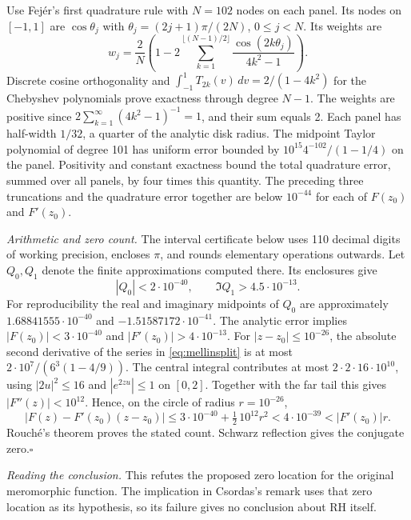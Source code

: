 \documentclass[11pt,a4paper]{article}
\begin{document}
Use Fej\'er's first quadrature rule with $N=102$ nodes on each panel.
Its nodes on $[-1,1]$ are $\cos\theta_j$ with
$\theta_j=(2j+1)\pi/(2N)$, $0\le j<N$. Its weights are
\[
 w_j=\frac2N\left(1-2\sum_{k=1}^{\lfloor(N-1)/2\rfloor}
                   \frac{\cos(2k\theta_j)}{4k^2-1}\right).
\]
Discrete cosine orthogonality and
$\int_{-1}^{1}T_{2k}(v)\,dv=2/(1-4k^2)$ for the Chebyshev
polynomials prove exactness through degree $N-1$. The weights are
positive since $2\sum_{k=1}^{\infty}(4k^2-1)^{-1}=1$, and their
sum equals 2. Each panel has half-width $1/32$, a quarter of the
analytic disk radius. The midpoint Taylor polynomial of degree 101
has uniform error bounded by $10^{15}4^{-102}/(1-1/4)$ on the panel.
Positivity and constant exactness bound the total quadrature error,
summed over all panels, by four times this quantity. The preceding
three truncations and the quadrature error together are below $10^{-44}$
for each of $F(z_0)$ and $F'(z_0)$.

\medskip\noindent
\emph{Arithmetic and zero count.} The interval certificate below uses
110 decimal digits of working precision, encloses $\pi$, and rounds
elementary operations outwards. Let $Q_0,Q_1$ denote the finite
approximations computed there. Its enclosures give
\[
 |Q_0|<2\cdot10^{-40},\qquad \Im Q_1>4.5\cdot10^{-13}.
\]
For reproducibility the real and imaginary midpoints of $Q_0$ are
approximately $1.68841555\cdot10^{-40}$ and
$-1.51587172\cdot10^{-41}$. The analytic error implies
$|F(z_0)|<3\cdot10^{-40}$ and $|F'(z_0)|>4\cdot10^{-13}$.
For $|z-z_0|\le 10^{-26}$, the absolute second derivative of the
series in \eqref{eq:mellinsplit} is at most
$2\cdot10^7/(6^3(1-4/9))$. The central integral contributes at most
$2\cdot2\cdot16\cdot10^{10}$, using $|2u|^2\le16$ and
$|e^{2zu}|\le1$ on $[0,2]$. Together with the far tail this gives
$|F''(z)|<10^{12}$. Hence, on the circle of radius $r=10^{-26}$,
\[
 |F(z)-F'(z_0)(z-z_0)|
 \le 3\cdot10^{-40}+\tfrac12\,10^{12}r^2
 <4\cdot10^{-39}< |F'(z_0)|r .
\]
Rouch\'e's theorem proves the stated count. Schwarz reflection gives
the conjugate zero.\hfill$\square$

\medskip\noindent
\emph{Reading the conclusion.} This refutes the proposed zero location
for the original meromorphic function. The implication in Csordas's
remark uses that zero location as its hypothesis, so its failure gives
no conclusion about RH itself.
\end{document}
